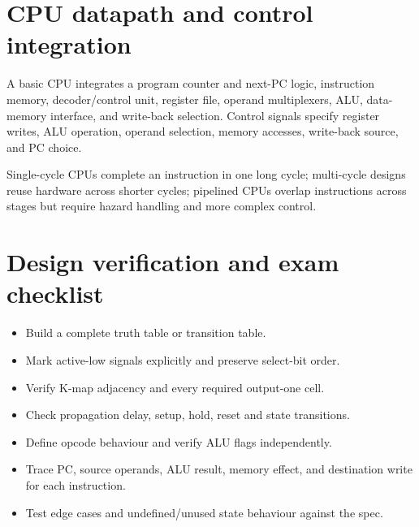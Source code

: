 \documentclass[11pt,a4paper]{article}
\begin{document}
\section{CPU datapath and control integration}
A basic CPU integrates a program counter and next-PC logic, instruction memory, decoder/control unit, register file, operand multiplexers, ALU, data-memory interface, and write-back selection. Control signals specify register writes, ALU operation, operand selection, memory accesses, write-back source, and PC choice.
\begin{center}\end{center}
Single-cycle CPUs complete an instruction in one long cycle; multi-cycle designs reuse hardware across shorter cycles; pipelined CPUs overlap instructions across stages but require hazard handling and more complex control.
\section{Design verification and exam checklist}
\begin{itemize}
\item Build a complete truth table or transition table.
\item Mark active-low signals explicitly and preserve select-bit order.
\item Verify K-map adjacency and every required output-one cell.
\item Check propagation delay, setup, hold, reset and state transitions.
\item Define opcode behaviour and verify ALU flags independently.
\item Trace PC, source operands, ALU result, memory effect, and destination write for each instruction.
\item Test edge cases and undefined/unused state behaviour against the spec.
\end{itemize}
\end{document}
